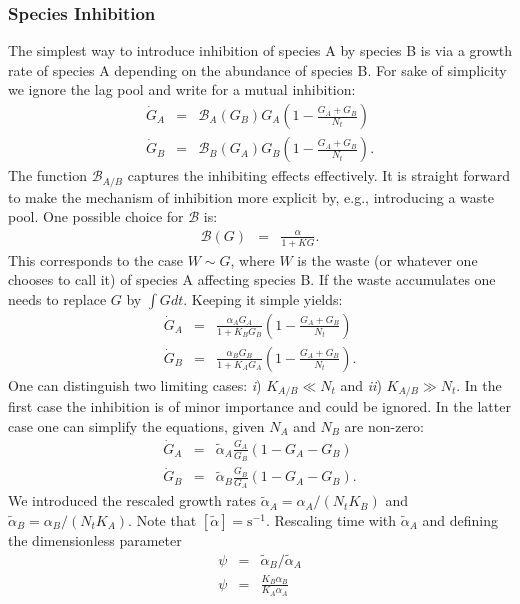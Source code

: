 \documentclass[10pt,A4paper]{article}
\begin{document}
\subsubsection{Species Inhibition}
The simplest way to introduce inhibition of species A by species B is via a growth rate of species A depending on the abundance of species B. 
For sake of simplicity we ignore the lag pool and write for a mutual inhibition:
\begin{eqnarray}
    \dot{G}_A &=& \mathcal{B}_A(G_B)G_A\left(1 - \frac{G_A+G_B}{N_t}\right)\\
    \dot{G}_B &=& \mathcal{B}_B(G_A) G_B\left(1-\frac{G_A+G_B}{N_t}\right). 
\end{eqnarray}
The function $\mathcal{B}_{A/B}$ captures the inhibiting effects effectively. 
It is straight forward to make the mechanism of inhibition more explicit by, e.g., introducing a waste pool. 
One possible choice for $\mathcal{B}$ is: 
\begin{eqnarray}
    \mathcal{B}(G)&=&\frac{\alpha}{1+KG}. 
\end{eqnarray}
This corresponds to the case $W\sim G$, where $W$ is the waste (or whatever one chooses to call it) of species A affecting species B. 
If the waste accumulates one needs to replace $G$ by $\int G dt$. Keeping it simple yields:
\begin{eqnarray}
    \dot{G}_A &=& \frac{\alpha_A G_A}{1+K_BG_B}\left(1 - \frac{G_A+G_B}{N_t}\right)\\
    \dot{G}_B &=& \frac{\alpha_B G_B}{1+K_AG_A}\left(1-\frac{G_A+G_B}{N_t}\right). 
\end{eqnarray}
One can distinguish two limiting cases: {\it i}) $K_{A/B}\ll N_t$ and {\it ii}) $K_{A/B}\gg N_t$. 
In the first case the inhibition is of minor importance and could be ignored. 
In the latter case one can simplify the equations, given $N_A$ and $N_B$ are non-zero:
\begin{eqnarray}
\label{Mut_Inhib}
    \dot{G}_A &=&\tilde{\alpha}_A\frac{G_A}{G_B}\left(1 - G_A-G_B\right)\\
    \dot{G}_B &=& \tilde{\alpha}_B\frac{G_B}{G_A}\left(1-G_A-G_B\right). 
\end{eqnarray}
We introduced the rescaled growth rates $\tilde{\alpha}_A=\alpha_A/(N_tK_B)$ and $\tilde{\alpha}_B=\alpha_B/(N_tK_A)$. Note that $[\tilde{\alpha}]=\mathrm{s}^{-1}$.
Rescaling time with $\tilde{\alpha}_A$ and defining the dimensionless parameter 
\begin{eqnarray}
    \psi&=&\tilde{\alpha}_B/\tilde{\alpha}_A\\
    \psi&=&\frac{K_B\alpha_B}{K_A\alpha_A}
\end{eqnarray}
\end{document}
